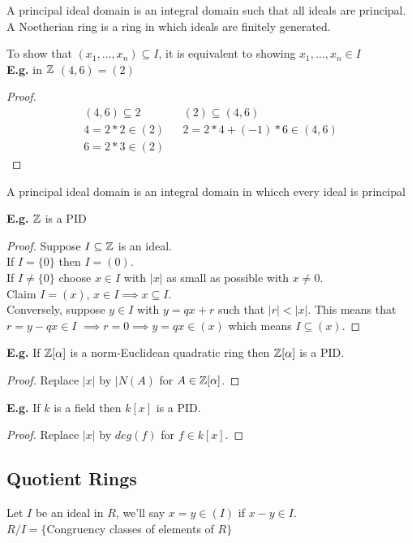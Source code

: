 \documentclass[11pt]{article}
\begin{document}
\begin{defn}
A principal ideal domain is an integral domain such that all ideals are principal. A Noetherian ring is a ring in which ideals are finitely generated.
\end{defn}
$ $\\[1em]
To show that $(x_1, \dots, x_n) \subseteq I$, it is equivalent to showing $x_1, \dots, x_n \in I$
$ $\\
\textbf{E.g.} in $\mathbb{Z}$ $(4,6) = (2)$
\begin{proof}
	\begin{align*}
		(4,6) \subseteq 2 && (2) \subseteq(4,6) \\
		4 = 2*2 \in (2) && 2=2*4 + (-1) *6 \in (4,6)\\
		6 = 2*3 \in (2) 
	\end{align*}
\end{proof}


\begin{defn}
A principal ideal domain is an integral domain in whicch every ideal is principal
\end{defn}

\textbf{E.g.} $\mathbb{Z}$ is a PID 

\begin{proof}
	Suppose $I \subseteq \mathbb{Z} $ is an ideal.\\[0.5em]
	If $I=\{0\} $ then $I=(0)$.\\
	If $I \neq \{0\}$ choose $x \in I$ with $|x|$ as small as possible with $x\neq 0 $.\\[1em]
	Claim $I=(x) $, $x \in I \implies x \subseteq I$.\\[1em]
Conversely, suppose $y \in I$ with $ y = qx + r$ such that $|r| < |x| $.
	This means that $r = y-qx \in I$ $\implies r = 0 \implies y= qx \in (x) $ which means $I\subseteq (x)$.
\end{proof}
$ $\\[0em]

\textbf{E.g.} If $\mathbb{Z}[\alpha]$ is a norm-Euclidean quadratic ring then $\mathbb{Z}[\alpha]$ is a PID.
\begin{proof}
	Replace $|x|$ by $|N(A)$ for $A \in \mathbb{Z}[\alpha]$.
\end{proof}

 \textbf{E.g.} If $k$ is a field then $k[x]$ is a PID.
\begin{proof}
	Replace $|x|$ by $deg(f)$ for $f \in k[x]$.
\end{proof}
\subsection{Quotient Rings}
Let $I$ be an ideal in $R$, we'll say $x=y \in (I)$ if $x-y \in I$.
$ $\\[1em]
$R/I = \{$Congruency classes of elements of $R$$\}$
\end{document}
